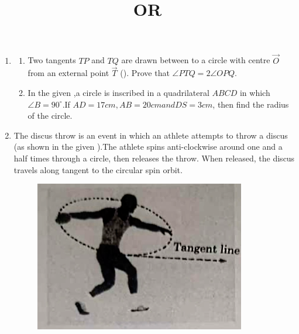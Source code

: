 \documentclass[12pt,A4 paper]{article}
\begin{document}
\begin{enumerate}
\begin{figure}[H]
	        \centering
	        
        \end{figure}






\item
  \begin{enumerate}
	  \item Two tangents $TP$ and $TQ$ are drawn between to a circle with centre $\vec{O}$ from an external point $\vec{T}$ (). Prove that $\angle PTQ = 2 \angle OPQ$.
\begin{figure}[h]
	        \centering
	        
		\caption{}
		\label{fig:5}
        \end{figure}






\begin{center}
    \title{OR}
\end{center}
\item In the given ,a circle is inscribed in a quadrilateral $ABCD$ in which $\angle B =90 ^{\circ}$.If $AD=17cm,AB=20cm and DS=3cm$, then find the radius of the circle.

\begin{figure}[h]
	        \centering
	        
		\caption{}
		\label{fig:6}
\end{figure}
   \end{enumerate}






\item The discus throw is an event in which an athlete attempts to throw a discus (as shown in the given ).The athlete spins anti-clockwise around one and a half times through a circle, then releases the throw. When released, the discus travels along tangent to the circular spin orbit.


\begin{figure}[H]	

	        \centering
		\includegraphics[width=\columnwidth]{figs/fig0.png}
		\caption{}
		\label{fig:0}
\end{figure}




\end{enumerate}
\end{document}

